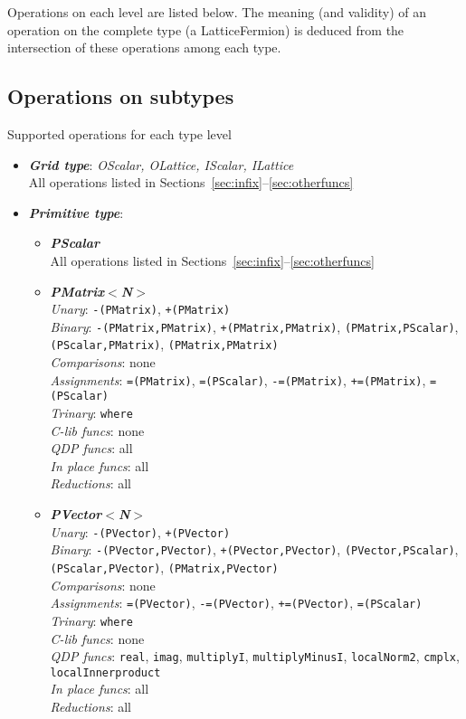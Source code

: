 \documentclass[12pt,letterpaper]{article}
\begin{document}
Operations on each level are listed below. The meaning (and validity)
of an operation on the complete type (a LatticeFermion) is deduced
from the intersection of these operations among each type.

\subsection{Operations on subtypes}

Supported operations for each type level
\begin{itemize}
\item
{\bf\em Grid type}: {\em OScalar, OLattice, IScalar, ILattice}\\
All operations listed in Sections~\ref{sec:infix}--\ref{sec:otherfuncs}

\item
{\bf\em Primitive type}:
\begin{itemize}
\item
{\bf\em PScalar}\\
All operations listed in Sections~\ref{sec:infix}--\ref{sec:otherfuncs}

\item
{\bf\em PMatrix$<$N$>$}\\
  {\em Unary}: {\tt -(PMatrix)}, {\tt +(PMatrix)}\\
  {\em Binary}: {\tt -(PMatrix,PMatrix)}, {\tt +(PMatrix,PMatrix)}, 
       {\tt *(PMatrix,PScalar)}, {\tt *(PScalar,PMatrix)}, {\tt *(PMatrix,PMatrix)}\\
  {\em Comparisons}: none\\
  {\em Assignments}: {\tt =(PMatrix)}, {\tt =(PScalar)}, {\tt -=(PMatrix)}, 
       {\tt +=(PMatrix)}, {\tt *=(PScalar)}\\
  {\em Trinary}: {\tt where}\\
  {\em C-lib funcs}: none\\
  {\em QDP funcs}: all\\
  {\em In place funcs}: all\\
  {\em Reductions}: all\\

\item
{\bf\em PVector$<$N$>$}\\
  {\em Unary}: {\tt -(PVector)}, {\tt +(PVector)}\\
  {\em Binary}: {\tt -(PVector,PVector)}, {\tt +(PVector,PVector)}, 
       {\tt *(PVector,PScalar)}, {\tt *(PScalar,PVector)}, {\tt *(PMatrix,PVector)}\\
  {\em Comparisons}: none\\
  {\em Assignments}: {\tt =(PVector)}, {\tt -=(PVector)}, {\tt +=(PVector)}, 
       {\tt *=(PScalar)}\\
  {\em Trinary}: {\tt where}\\
  {\em C-lib funcs}: none\\
  {\em QDP funcs}: {\tt real}, {\tt imag}, {\tt multiplyI}, {\tt multiplyMinusI}, 
        {\tt localNorm2}, {\tt cmplx}, {\tt localInnerproduct}\\
  {\em In place funcs}: all\\
  {\em Reductions}: all\\


\end{itemize}
\end{itemize}
\end{document}
